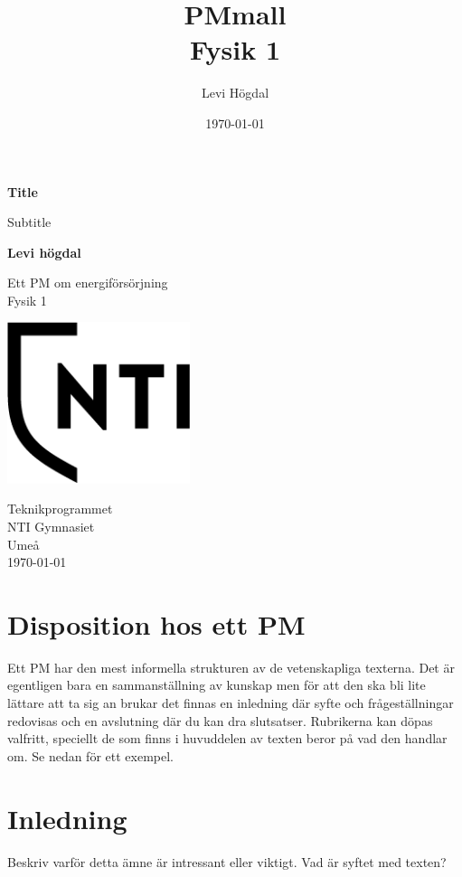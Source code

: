 \documentclass[11p]{article}
\title{PMmall \\ \small Fysik 1}
\author{Levi Högdal }
\date{\today}
\begin{document}
 \begin{titlepage}
  \begin{center}
   \vspace*{1cm}

   \Huge
   \textbf{Title}

   \vspace{0.5cm}
   \LARGE
   Subtitle

   \vspace{1.5cm}

   \textbf{Levi högdal}

   \vfill

   Ett PM om energiförsörjning \\
   Fysik 1

   \vspace{0.8cm}

   \includegraphics[width=0.4\textwidth]{NTI Gymnasiet_Symbol_print_svart.png}

   \Large
   Teknikprogrammet\\
   NTI Gymnasiet\\
   Umeå\\
   \today

  \end{center}
 \end{titlepage}
 \tableofcontents
 \newpage
 \section{Disposition hos ett PM}
 Ett PM har den mest informella strukturen av de vetenskapliga texterna. Det är egentligen bara en sammanställning av kunskap men för att den ska bli lite lättare att ta sig an brukar det finnas en inledning där syfte och frågeställningar redovisas och en avslutning där du kan dra slutsatser. Rubrikerna kan döpas valfritt, speciellt de som finns i huvuddelen av texten beror på vad den handlar om. Se nedan för ett exempel.

 \section{Inledning}
 Beskriv varför detta ämne är intressant eller viktigt. Vad är syftet med texten?
\end{document}

